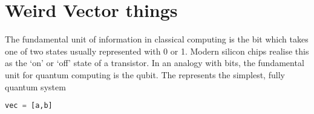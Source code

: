 \section{Weird Vector things}
The fundamental unit of information in classical computing is the bit which takes one of two states usually represented with 0 or 1. Modern silicon chips realise this as the `on' or `off' state of a transistor. In an analogy with bits, the fundamental unit for quantum computing is the qubit. The represents the simplest, fully quantum system 

\begin{lstlisting}[language=Python]
vec = [a,b]
\end{lstlisting}